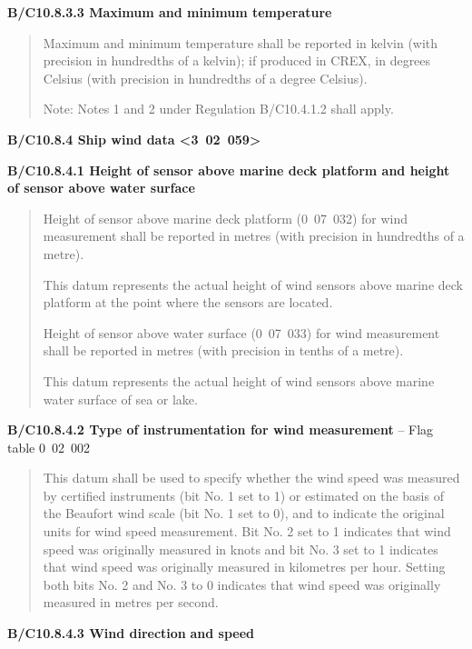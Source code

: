 \textbf{B/C10.8.3.3 Maximum and minimum temperature}

\begin{quote}
Maximum and minimum temperature shall be reported in kelvin (with precision in hundredths of a kelvin); if produced in CREX, in degrees Celsius (with precision in hundredths of a degree Celsius).

Note: Notes 1 and 2 under Regulation B/C10.4.1.2 shall apply.
\end{quote}

\textbf{B/C10.8.4 Ship wind data \textless3~02~059\textgreater{}}

\textbf{B/C10.8.4.1 Height of sensor above marine deck platform and height of sensor above water surface}

\begin{quote}
Height of sensor above marine deck platform (0~07~032) for wind measurement shall be reported in metres (with precision in hundredths of a metre).

This datum represents the actual height of wind sensors above marine deck platform at the point where the sensors are located.

Height of sensor above water surface (0~07~033) for wind measurement shall be reported in metres (with precision in tenths of a metre).

This datum represents the actual height of wind sensors above marine water surface of sea or lake.
\end{quote}

\textbf{B/C10.8.4.2 Type of instrumentation for wind measurement} -- Flag table 0~02~002

\begin{quote}
This datum shall be used to specify whether the wind speed was measured by certified instruments (bit No. 1 set to 1) or estimated on the basis of the Beaufort wind scale (bit No. 1 set to 0), and to indicate the original units for wind speed measurement. Bit No. 2 set to 1 indicates that wind speed was originally measured in knots and bit No. 3 set to 1 indicates that wind speed was originally measured in kilometres per hour. Setting both bits No. 2 and No. 3 to 0 indicates that wind speed was originally measured in metres per second.
\end{quote}

\textbf{B/C10.8.4.3 Wind direction} \textbf{and speed}

